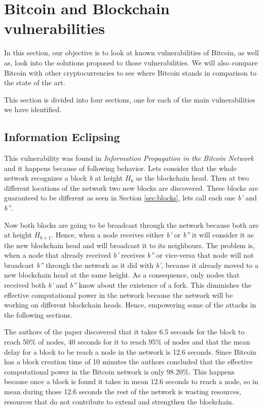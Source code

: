 


\section{Bitcoin and Blockchain vulnerabilities}
\label{sec:vulnerabilities}
In this section, our objective is to look at known vulnerabilities of Bitcoin, as well as, look into the solutions proposed to those vulnerabilities. We will also compare Bitcoin with other cryptocurrencies to see where Bitcoin stands in comparison to the state of the art.

This section is divided into four sections, one for each of the main vulnerabilities we have identified.

\subsection{Information Eclipsing}
\label{sec:ieclipsing}
This vulnerability was found in \textit{Information Propagation in the Bitcoin Network} \cite{decker2013information} and it happens because of following behavior. Lets consider that the whole network recognizes a block \textit{b} at height $H_b$ as the blockchain head. Then at two different locations of the network two new blocks are discovered. These blocks are guaranteed to be different as seen in Section \ref{sec:blocks}, lets call each one \textit{b'} and \textit{b''}.

Now both blocks are going to be broadcast through the network because both are at height $H_{b+1}$. Hence, when a node receives either \textit{b'} or \textit{b''} it will consider it as the new blockchain head and will broadcast it to its neighbours. The problem is, when a node that already received \textit{b'} receives \textit{b''} or vice-versa that node will not broadcast \textit{b''} through the network as it did with \textit{b'}, because it already moved to a new blockchain head at the same height. As a consequence, only nodes that received both \textit{b'} and \textit{b''} know about the existence of a fork. This diminishes the effective computational power in the network because the network will be working on different blockchain heads. Hence, empowering some of the attacks in the following sections.

The authors of the paper discovered that it takes 6.5 seconds for the block to reach 50\% of nodes, 40 seconds for it to reach 95\% of nodes and that the mean delay for a block to be reach a node in the network is 12.6 seconds. Since Bitcoin has a block creation time of 10 minutes the authors concluded that the effective computational power in the Bitcoin network is only 98.20\%. This happens because once a block is found it takes in mean 12.6 seconds to reach a node, so in mean during those 12.6 seconds the rest of the network is wasting resources, resources that do not contribute to extend and strengthen the blockchain.

